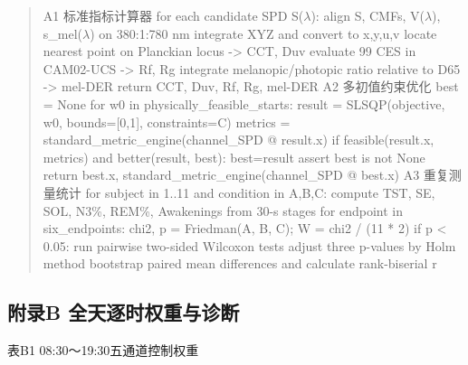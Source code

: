 \documentclass[UTF8,a4paper,12pt]{ctexart}
\begin{document}
\begin{quote}\small
A1  标准指标计算器 for each candidate SPD S($\lambda$):     align S, CMFs, V($\lambda$), s\_mel($\lambda$) on 380:1:780 nm     integrate XYZ and convert to x,y,u,v     locate nearest point on Planckian locus -> CCT, Duv     evaluate 99 CES in CAM02-UCS -> Rf, Rg     integrate melanopic/photopic ratio relative to D65 -> mel-DER return CCT, Duv, Rf, Rg, mel-DER A2  多初值约束优化 best = None for w0 in physically\_feasible\_starts:     result = SLSQP(objective, w0, bounds=[0,1], constraints=C)     metrics = standard\_metric\_engine(channel\_SPD @ result.x)     if feasible(result.x, metrics) and better(result, best): best=result assert best is not None return best.x, standard\_metric\_engine(channel\_SPD @ best.x) A3  重复测量统计 for subject in 1..11 and condition in A,B,C:     compute TST, SE, SOL, N3\%, REM\%, Awakenings from 30-s stages for endpoint in six\_endpoints:     chi2, p = Friedman(A, B, C); W = chi2 / (11 * 2)     if p < 0.05:         run pairwise two-sided Wilcoxon tests         adjust three p-values by Holm method         bootstrap paired mean differences and calculate rank-biserial r
\end{quote}

\subsection{附录B  全天逐时权重与诊断}

表B1  08:30～19:30五通道控制权重
\end{document}
